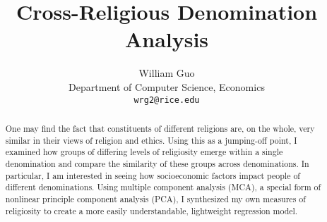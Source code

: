 \documentclass{article}
\title{Cross-Religious Denomination Analysis}
\author{
	William Guo\\
	Department of Computer Science, Economics \\
	\texttt{wrg2@rice.edu} \\
}
\begin{document}
	\maketitle
	
	\begin{abstract}
	One may find the fact that constituents of different religions are, on the whole, very similar in their views of religion and ethics. Using this as a jumping-off point, I examined how groups of differing levels of religiosity emerge within a single denomination and compare the similarity of these groups across denominations. In particular, I am interested in seeing how socioeconomic factors impact people of different denominations. Using multiple component analysis (MCA), a special form of nonlinear principle component analysis (PCA), I synthesized my own measures of religiosity to create a more easily understandable, lightweight regression model.
	\end{abstract}
	
\end{document}
